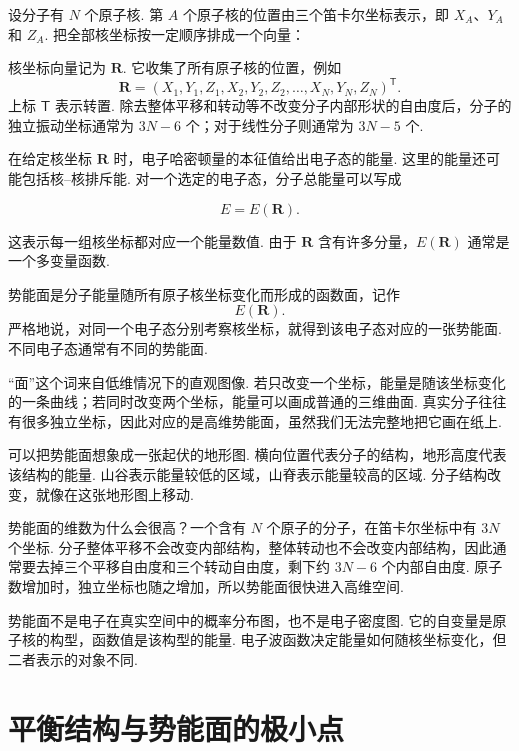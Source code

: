\documentclass[UTF8,11pt,a4paper,openany]{ctexbook}
\begin{document}
设分子有 $N$ 个原子核. 第 $A$ 个原子核的位置由三个笛卡尔坐标表示，即 $X_A$、$Y_A$ 和 $Z_A$. 把全部核坐标按一定顺序排成一个向量：

\begin{notationbox}
核坐标向量记为 $\mathbf R$. 它收集了所有原子核的位置，例如
\[
\mathbf R=(X_1,Y_1,Z_1,X_2,Y_2,Z_2,\ldots,X_N,Y_N,Z_N)^{\mathsf T}.
\]
上标 $\mathsf T$ 表示转置. 除去整体平移和转动等不改变分子内部形状的自由度后，分子的独立振动坐标通常为 $3N-6$ 个；对于线性分子则通常为 $3N-5$ 个. 
\end{notationbox}

在给定核坐标 $\mathbf R$ 时，电子哈密顿量的本征值给出电子态的能量. 这里的能量还可能包括核--核排斥能. 对一个选定的电子态，分子总能量可以写成

\[
E=E(\mathbf R).
\]

这表示每一组核坐标都对应一个能量数值. 由于 $\mathbf R$ 含有许多分量，$E(\mathbf R)$ 通常是一个多变量函数. 

\begin{definitionbox}
势能面是分子能量随所有原子核坐标变化而形成的函数面，记作
\[
E(\mathbf R).
\]
严格地说，对同一个电子态分别考察核坐标，就得到该电子态对应的一张势能面. 不同电子态通常有不同的势能面. 
\end{definitionbox}

“面”这个词来自低维情况下的直观图像. 若只改变一个坐标，能量是随该坐标变化的一条曲线；若同时改变两个坐标，能量可以画成普通的三维曲面. 真实分子往往有很多独立坐标，因此对应的是高维势能面，虽然我们无法完整地把它画在纸上. 

\begin{analogybox}
可以把势能面想象成一张起伏的地形图. 横向位置代表分子的结构，地形高度代表该结构的能量. 山谷表示能量较低的区域，山脊表示能量较高的区域. 分子结构改变，就像在这张地形图上移动. 
\end{analogybox}

势能面的维数为什么会很高？一个含有 $N$ 个原子的分子，在笛卡尔坐标中有 $3N$ 个坐标. 分子整体平移不会改变内部结构，整体转动也不会改变内部结构，因此通常要去掉三个平移自由度和三个转动自由度，剩下约 $3N-6$ 个内部自由度. 原子数增加时，独立坐标也随之增加，所以势能面很快进入高维空间. 

\begin{limitbox}
势能面不是电子在真实空间中的概率分布图，也不是电子密度图. 它的自变量是原子核的构型，函数值是该构型的能量. 电子波函数决定能量如何随核坐标变化，但二者表示的对象不同. 
\end{limitbox}

\section{平衡结构与势能面的极小点}
\end{document}
